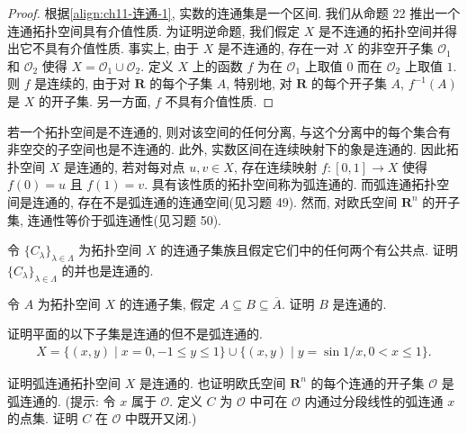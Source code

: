 \documentclass[../../main.tex]{subfiles}
\begin{document}
\begin{proof}
根据\eqref{align:ch11-连通-1}, 实数的连通集是一个区间. 我们从命题 22 推出一个连通拓扑空间具有介值性质. 为证明逆命题, 我们假定 $X$ 是不连通的拓扑空间并得出它不具有介值性质. 事实上, 由于 $X$ 是不连通的, 存在一对 $X$ 的非空开子集 $\mathcal{O}_{1}$ 和 $\mathcal{O}_{2}$ 使得 $X=\mathcal{O}_{1}\cup\mathcal{O}_{2}$. 定义 $X$ 上的函数 $f$ 为在 $\mathcal{O}_{1}$ 上取值 $0$ 而在 $\mathcal{O}_{2}$ 上取值 $1$. 则 $f$ 是连续的, 由于对 $\mathbf{R}$ 的每个子集 $A$, 特别地, 对 $\mathbf{R}$ 的每个开子集 $A$, $f^{-1}(A)$ 是 $X$ 的开子集. 另一方面, $f$ 不具有介值性质.
\end{proof}

若一个拓扑空间是不连通的, 则对该空间的任何分离, 与这个分离中的每个集合有非空交的子空间也是不连通的. 此外, 实数区间在连续映射下的象是连通的. 因此拓扑空间 $X$ 是连通的, 若对每对点 $u,v\in X$, 存在连续映射 $f:[0,1]\to X$ 使得 $f(0)=u$ 且 $f(1)=v$. 具有该性质的拓扑空间称为弧连通的. 而弧连通拓扑空间是连通的, 存在不是弧连通的连通空间(见习题 49). 然而, 对欧氏空间 $\mathbf{R}^{n}$ 的开子集, 连通性等价于弧连通性(见习题 50).

\begin{exercise}\label{exercise:ch11-47}
令 $\{C_{\lambda}\}_{\lambda\in\Lambda}$ 为拓扑空间 $X$ 的连通子集族且假定它们中的任何两个有公共点. 证明 $\{C_{\lambda}\}_{\lambda\in\Lambda}$ 的并也是连通的.
\end{exercise}

\begin{exercise}\label{exercise:ch11-48}
令 $A$ 为拓扑空间 $X$ 的连通子集, 假定 $A\subseteq B\subseteq\overline{A}$. 证明 $B$ 是连通的.
\end{exercise}

\begin{exercise}\label{exercise:ch11-49}
证明平面的以下子集是连通的但不是弧连通的.
\begin{align*}
X=\{(x,y)\mid x=0,-1\leqslant y\leqslant 1\}\cup\{(x,y)\mid y=\sin 1/x,0<x\leqslant 1\}.
\end{align*}
\end{exercise}

\begin{exercise}\label{exercise:ch11-50}
证明弧连通拓扑空间 $X$ 是连通的. 也证明欧氏空间 $\mathbf{R}^{n}$ 的每个连通的开子集 $\mathcal{O}$ 是弧连通的. (提示: 令 $x$ 属于 $\mathcal{O}$. 定义 $C$ 为 $\mathcal{O}$ 中可在 $\mathcal{O}$ 内通过分段线性的弧连通 $x$ 的点集. 证明 $C$ 在 $\mathcal{O}$ 中既开又闭.)
\end{exercise}
\end{document}
